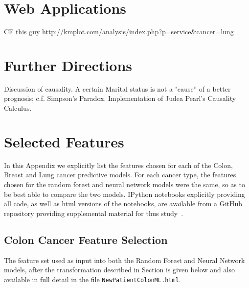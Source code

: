 \documentclass[a4paper,11pt]{article}
\newcommand{\codewhite}[1]{\colorbox{white}{\texttt{#1}}}
\begin{document}
\section{Web Applications}

CF this guy \url{http://kmplot.com/analysis/index.php?p=service&cancer=lung}



\section{Further Directions}

Discussion of causality. A certain Marital status is not a "cause'' of a better prognosis; c.f. Simpson's Paradox. Implementation of Judea Pearl's Causality Calculus.


\appendix
\section{Selected Features}
\label{sec:features}
In this Appendix we explicitly list the features chosen for each of the Colon, Breast and Lung cancer predictive models. For each cancer type, the features chosen for the random forest and neural network models were the same, so as to be best able to compare the two models.
IPython notebooks explicitly providing all code, as well as html versions of the notebooks, are available from a GitHub repository providing supplemental material for thus study~\cite{supp}.



\subsection{Colon Cancer Feature Selection}
\label{subsec:colonfeatures}

The feature set used as input into both the Random Forest and Neural Network models, after the transformation described in Section is given below and also available in full detail in the file 
\codewhite{NewPatientColonML.html}.
\end{document}
